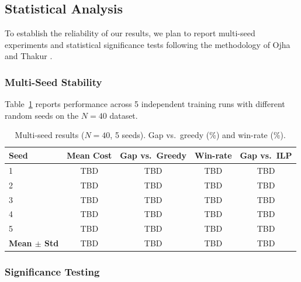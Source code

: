 \documentclass[conference]{IEEEtran}
\begin{document}
\subsection{Statistical Analysis}\label{sec:stats}

To establish the reliability of our results, we plan to report multi-seed experiments and statistical significance tests following the methodology of Ojha and Thakur \cite{ojha2025obstacle}.


\subsubsection{Multi-Seed Stability}

Table~\ref{tab:multiseed} reports performance across 5 independent training runs with different random seeds on the $N{=}40$ dataset.

\begin{table}[htbp]
\caption{Multi-seed results ($N{=}40$, 5 seeds). Gap vs.\ greedy (\%) and win-rate (\%).}
\label{tab:multiseed}
\centering
\begin{tabular}{@{}lcccc@{}}
\toprule
\textbf{Seed} & \textbf{Mean Cost} & \textbf{Gap vs.\ Greedy} & \textbf{Win-rate} & \textbf{Gap vs.\ ILP} \\
\midrule
1 & TBD & TBD & TBD & TBD \\
2 & TBD & TBD & TBD & TBD \\
3 & TBD & TBD & TBD & TBD \\
4 & TBD & TBD & TBD & TBD \\
5 & TBD & TBD & TBD & TBD \\
\midrule
\textbf{Mean $\pm$ Std} & TBD & TBD & TBD & TBD \\
\bottomrule
\end{tabular}
\end{table}

\subsubsection{Significance Testing}
\end{document}
